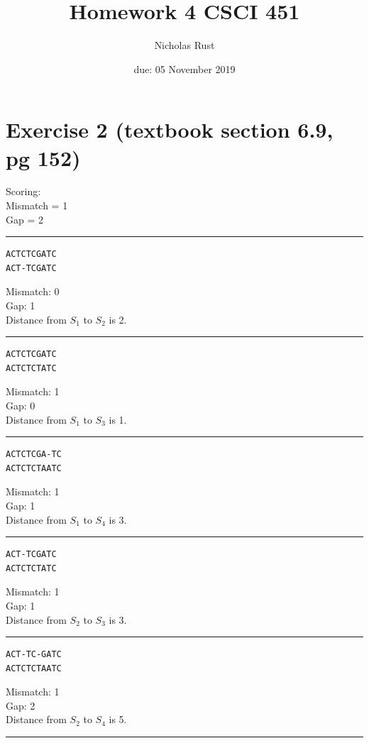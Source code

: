 \documentclass{article}
\title{Homework 4 CSCI 451}
\author{Nicholas Rust}
\date{due: 05 November 2019}
\begin{document}
\maketitle

\section{Exercise 2 (textbook section 6.9, pg 152)}

Scoring:\\
Mismatch = 1\\
Gap = 2

\noindent\rule{8cm}{0.4pt}

\begin{verbatim} 
ACTCTCGATC 
ACT-TCGATC
\end{verbatim}
Mismatch: 0\\
Gap: 1\\
Distance from $S_1$ to $S_2$ is 2.

\noindent\rule{8cm}{0.4pt}

\begin{verbatim} 
ACTCTCGATC 
ACTCTCTATC
\end{verbatim}
Mismatch: 1\\
Gap: 0\\
Distance from $S_1$ to $S_3$ is 1.

\noindent\rule{8cm}{0.4pt}

\begin{verbatim} 
ACTCTCGA-TC 
ACTCTCTAATC
\end{verbatim}
Mismatch: 1\\
Gap: 1\\
Distance from $S_1$ to $S_4$ is 3.

\noindent\rule{8cm}{0.4pt}

\begin{verbatim} 
ACT-TCGATC 
ACTCTCTATC
\end{verbatim}
Mismatch: 1\\
Gap: 1\\
Distance from $S_2$ to $S_3$ is 3.

\noindent\rule{8cm}{0.4pt}

\begin{verbatim} 
ACT-TC-GATC 
ACTCTCTAATC
\end{verbatim}
Mismatch: 1\\
Gap: 2\\
Distance from $S_2$ to $S_4$ is 5.

\noindent\rule{8cm}{0.4pt}
\end{document}
